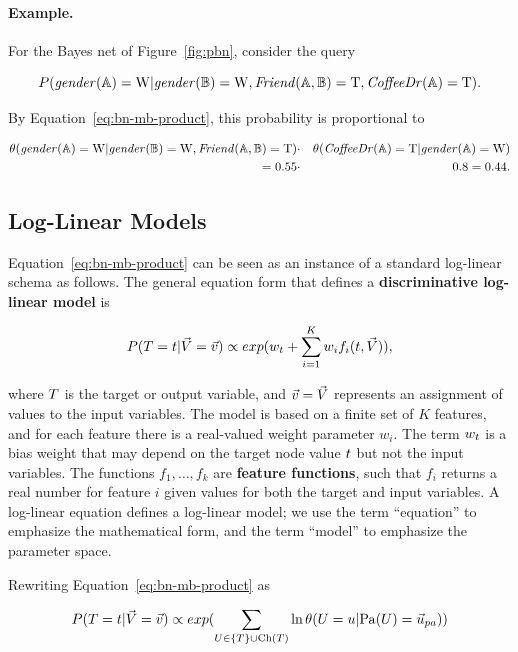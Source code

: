 \documentclass[twoside,11pt]{article}
\newcommand{\strongpoint}[1]{\paragraph{#1.}}
\begin{document}
\strongpoint{Example} For the Bayes net of Figure~\ref{fig:pbn}, consider the query

$$P(\it{gender}(\mathbb{A}) = \mathrm{W} | \it{gender}(\mathbb{B}) = \mathrm{W}, \it{Friend}(\mathbb{A},\mathbb{B}) = \mathrm{T}, \it{CoffeeDr}(\mathbb{A}) = \mathrm{T}).$$

\noindent By Equation~\ref{eq:bn-mb-product}, this probability is proportional to 

\begin{eqnarray*}
\theta(\it{gender}(\mathbb{A}) = \mathrm{W}|\it{gender}(\mathbb{B}) = \mathrm{W}, \it{Friend}(\mathbb{A},\mathbb{B}) = \mathrm{T}) & \cdot & \theta(\it{CoffeeDr}(\mathbb{A}) = \mathrm{T}|\it{gender}(\mathbb{A}) = \mathrm{W}) \\
= 0.55 &\cdot &0.8 = 0.44.
\end{eqnarray*}


\subsection{Log-Linear Models}

Equation~\ref{eq:bn-mb-product} can be seen as an instance of a standard log-linear schema as follows. The general equation form that defines a \textbf{discriminative log-linear model} \cite[Sec.4.2.2.1]{Sutton2007} is 

\begin{equation} \label{eq:log-linear}
P(T = t | \vec{V} = \vec{v}) \propto exp(w_{t} + \sum_{i=1}^{K} w_{i} f_{i}(t,\vec{V})),
\end{equation}

\noindent where $T$ is the target or output variable, and $\vec{v} = \vec{V}$ represents an assignment of values to the input variables. The model is based on a finite set of $K$ features, and for each feature there is a real-valued weight parameter $w_{i}$. The term $w_{t}$ is a bias weight that may depend on the target node value $t$ but not the input variables. The functions $f_{1},\ldots,f_{k}$ are \textbf{feature functions}, such that $f_{i}$ returns a real number for feature $i$ given values for both the target and input variables. A log-linear equation defines a log-linear model; we use the term ``equation'' to emphasize the mathematical form, and the term ``model'' to emphasize the parameter space.

Rewriting Equation~\ref{eq:bn-mb-product} as 

\begin{equation} \label{eq:bn-mb}
\Gprob{\TT = \TV} {\VF = \VTuple} \propto exp(\sum_{\UT \in \{\TT\} \cup \Ch{\TT}} \ln\cprob{\UT = \UV}{\Pa{\UT} = \Prange{\UT}})
\end{equation}
\end{document}
